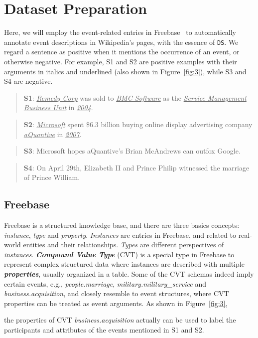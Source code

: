 \section{Dataset Preparation}
Here, we will employ the event-related entries in Freebase~\cite{bollacker2008freebase} to automatically annotate event descriptions in Wikipedia's pages, with the essence of  \texttt{DS}. We regard a sentence as positive when it mentions the occurrence of an event, or otherwise negative. For example, S1 and S2 are positive examples with their arguments in italics and underlined (also shown in Figure~\ref{fig:3}), while S3 and S4 are negative.
\begin{quote}
	\textbf{S1}: \underline{\emph{Remedy Corp}} was sold to \underline{\emph{BMC Software}} as the \underline{\emph{Service Management Business Unit}} in \underline{\emph{2004}}.
\end{quote}
\begin{quote}
	\textbf{S2}: \underline{\emph{Microsoft}} spent \$6.3 billion buying online display advertising company \underline{\emph{aQuantive}} in \underline{\emph{2007}}.
\end{quote}
\begin{quote}
	\textbf{S3}: Microsoft hopes aQuantive's Brian McAndrews can outfox Google.
\end{quote}
\begin{quote}
	\textbf{S4}: On April 29th, Elizabeth II and Prince Philip witnessed the marriage of Prince William.
\end{quote}
%
\subsection{Freebase}
Freebase is a structured knowledge base, and there are three basics concepts: \emph{instance}, \emph{type} and \emph{property}. \emph{Instances} are entries in Freebase, and related to real-world entities and their relationships. \emph{Types} are different perspectives of \emph{instances}. \textbf{\emph{Compound Value Type}} (CVT) is a special type in Freebase to represent complex structured data where instances are described with multiple \textbf{\emph{properties}}, usually organized in a table. Some of the CVT schemas indeed imply certain events, e.g., \emph{people.marriage}, \emph{military.military\_service} and \emph{business.acquisition}, and closely resemble to event structures, where CVT properties can be treated as event arguments. As shown in Figure~\ref{fig:3}, 

the properties of CVT  \emph{business.acquisition}  actually can be used to label  %
the participants and attributes of the events mentioned in S1 and S2.

